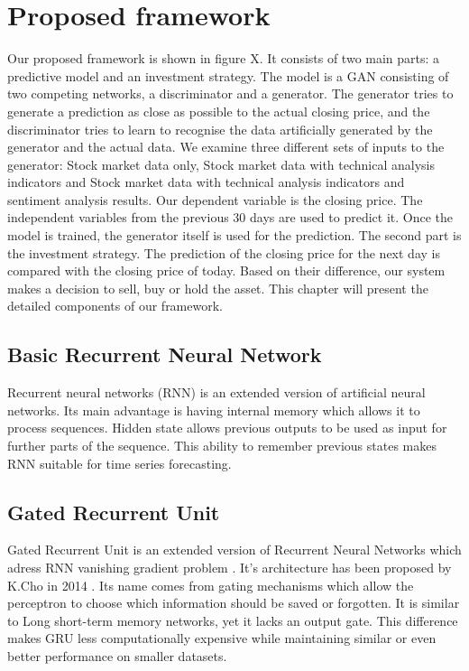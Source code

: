 \documentclass[11pt]{article} %
\begin{document}
\section{Proposed framework}
Our proposed framework is shown in figure X. It consists of two main parts: a predictive model and an investment strategy. The model is a GAN consisting of two competing networks, a discriminator and a generator. The generator tries to generate a prediction as close as possible to the actual closing price, and the discriminator tries to learn to recognise the data artificially generated by the generator and the actual data. We examine three different sets of inputs to the generator: Stock market data only, Stock market data with technical analysis indicators and Stock market data with technical analysis indicators and sentiment analysis results. Our dependent variable is the closing price. The independent variables from the previous 30 days are used to predict it.  Once the model is trained, the generator itself is used for the prediction. The second part is the investment strategy. The prediction of the closing price for the next day is compared with the closing price of today. Based on their difference, our system makes a decision to sell, buy or hold the asset. This chapter will present the detailed components of our framework. 


\subsection{Basic Recurrent Neural Network}

Recurrent neural networks (RNN) is an extended version of artificial neural networks. Its main advantage is having internal memory which allows it to process sequences. Hidden state allows previous outputs to be used as input for further parts of the sequence. This ability to remember previous states makes RNN suitable for time series forecasting. 

\subsection{Gated Recurrent Unit}

Gated Recurrent Unit is an extended version of Recurrent Neural Networks which adress RNN vanishing gradient problem \cite{gru2}.
It's architecture has been proposed by K.Cho in 2014 \cite{gru3}. Its name comes from gating mechanisms which allow the perceptron to choose which information should be saved or forgotten. It is similar to  Long short-term memory networks, yet it lacks an output gate. This difference makes GRU less computationally expensive while maintaining similar or even better performance on smaller datasets. 
\end{document}

